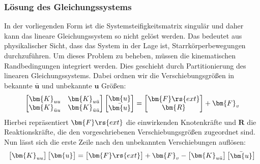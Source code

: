 \documentclass[letterpaper,10pt,german]{jupyterBook}
\begin{document}
\subsubsection{Lösung des Gleichungssystems}
\label{\detokenize{chapters/chapter2/1dFEM:losung-des-gleichungssystems}}
\sphinxAtStartPar
In der vorliegenden Form ist die Systemsteifigkeitsmatrix singulär und daher kann das lineare Gleichungssystem so nicht gelöst werden. Das bedeutet aus physikalischer Sicht, dass das System in der Lage ist, Starrkörperbewegungen durchzuführen. Um dieses Problem zu beheben, müssen die kinematischen Randbedingungen integriert werden. Dies geschieht durch Partitionierung des linearen Gleichungssystems. Dabei ordnen wir die Verschiebungsgrößen in bekannte \(\bar{\bm{u}}\) und unbekannte \(\bm{u}\) Größen:
\begin{equation}\label{equation:chapters/chapter2/1dFEM:LGSsolve1}
\begin{split}\begin{bmatrix}
\bm{K}_{uu} & \bm{K}_{u\bar{u}} \\
\bm{K}_{\bar{u}u} & \bm{K}_{\bar{u}\bar{u}}
\end{bmatrix}
\begin{bmatrix}
\bm{u} \\
\bar{\bm{u}}
\end{bmatrix} = \begin{bmatrix} \bm{F}\rs{ext} \\ \bm{R} \end{bmatrix} + \bm{F}_v\end{split}
\end{equation}
\sphinxAtStartPar
Hierbei repräsentiert \(\bm{F}\rs{ext}\) die einwirkenden Knotenkräfte und \(\bm{R}\) die Reaktionskräfte, die den vorgeschriebenen Verschiebungsgrößen zugeordnet sind. Nun lässt sich die erste Zeile nach den unbekannten Verschiebungen auflösen:
\begin{equation}\label{equation:chapters/chapter2/1dFEM:LGSsolve2}
\begin{split}\begin{bmatrix}
\bm{K}_{uu}
\end{bmatrix}
\begin{bmatrix}
\bm{u}
\end{bmatrix} = \begin{bmatrix} \bm{F}\rs{ext}\end{bmatrix} + \bm{F}_v - \begin{bmatrix}
\bm{K}_{u\bar{u}} 
\end{bmatrix} \begin{bmatrix}
\bar{\bm{u}}
\end{bmatrix}\end{split}
\end{equation}
\end{document}

